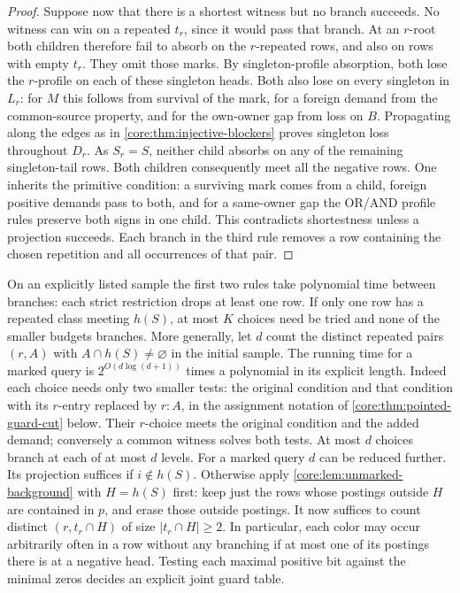 \begin{proof}
Suppose now that there is a shortest witness but no branch succeeds.
No witness can win on a repeated $t_r$, since it would pass that branch.
At an $r$-root both children
therefore fail to absorb on the $r$-repeated rows, and also on rows
with empty $t_r$. They omit those marks. By singleton-profile
absorption, both lose the $r$-profile on each of these singleton heads.
Both also lose on every singleton in $L_r$: for $M$ this follows from
survival of the mark, for a foreign demand from the common-source
property, and for the own-owner gap from loss on $B$. Propagating along
the edges as in \cref{core:thm:injective-blockers} proves singleton
loss throughout $D_r$. As $S_r=S$, neither child absorbs on any of
the remaining singleton-tail rows. Both children consequently meet
all the negative rows. One inherits the primitive condition: a surviving
mark comes from a child, foreign positive demands pass to both, and for
a same-owner gap the OR/AND profile rules preserve both signs in one
child. This contradicts shortestness unless a projection succeeds.
Each branch in the third rule removes a row containing the chosen
repetition and all occurrences of that pair.
\end{proof}

On an explicitly listed sample the first two rules take polynomial
time between branches: each strict restriction drops at least one row.
If only one row has a repeated class meeting $h(S)$, at most $K$
choices need be tried and none of the smaller budgets branches.
More generally, let $d$ count the distinct repeated pairs $(r,A)$
with $A\cap h(S)\ne\varnothing$ in the initial sample. The running time
for a marked query is $2^{O(d\log(d+1))}$ times a polynomial in its
explicit length. Indeed each choice needs only two smaller tests:
the original condition and that condition with its $r$-entry replaced
by $r:A$, in the assignment notation of \cref{core:thm:pointed-guard-cut}
below. Their $r$-choice meets the original condition and the added
demand; conversely a common witness solves both tests. At most $d$
choices branch at each of at most $d$ levels.
For a marked query $d$ can be reduced further. Its projection
suffices if $i\notin h(S)$. Otherwise apply
\cref{core:lem:unmarked-background} with $H=h(S)$ first:
keep just the rows whose postings outside $H$ are contained in $p$,
and erase those outside postings. It now suffices to count distinct
$(r,t_r\cap H)$ of size $|t_r\cap H|\ge2$. In particular, each
color may occur arbitrarily often in a row without any branching
if at most one of its postings there is at a negative head. Testing
each maximal positive bit against the minimal zeros decides an
explicit joint guard table.

